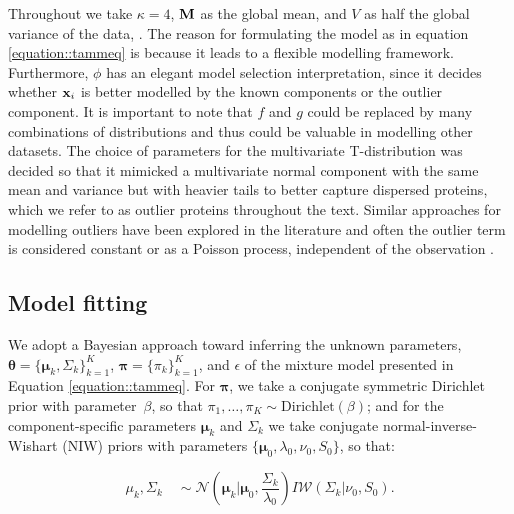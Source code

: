 \documentclass[12pt,english]{article}\usepackage[]{graphicx}\usepackage[]{color}
\begin{document}
Throughout we take $\kappa = 4$, ${\bf M}$ as the global mean, and $V$
as half the global variance of the data, {\color{black}{including labelled and unlabelled proteins}}.
The reason for formulating
the model as in equation \eqref{equation::tammeq} is because it leads
to a flexible modelling framework. Furthermore, $\phi$ has an elegant
model selection interpretation, since it decides whether ${\bf x}_i$
is better modelled by the known components or the outlier component.
It is important to note that $f$ and $g$ could be replaced by many
combinations of distributions and thus could be valuable in modelling
other datasets. The choice of parameters for the multivariate
T-distribution was decided so that it mimicked a multivariate normal
component with the same mean and variance but with heavier tails to
better capture dispersed proteins, which we refer to as outlier
proteins throughout the text. {\color{black}{The variance of the multivariate T-distribution
is designed to be large such that is relatively flat when compared with multivariate Gaussian
distributions which describe annotated components. }} Similar approaches for modelling
outliers have been explored in the literature and often the outlier
term is considered constant or as a Poisson process, independent of
the observation \citep{Banfield::1993, Cooke::2011, Coretto::2016,
  Hennig::2004}.


\subsection*{Model fitting}

We adopt a Bayesian approach toward inferring the unknown parameters,
$\boldsymbol{\theta} = \{\boldsymbol{\mu}_k, \Sigma_k \}_{k = 1}^K$,
$\boldsymbol{\pi} = \{\pi_k\}_{k = 1}^K$, and $\epsilon$ of the
mixture model presented in Equation \eqref{equation::tammeq}.  For
$\boldsymbol{\pi}$, we take a conjugate symmetric Dirichlet prior with
parameter~$\beta$, so that
$\pi_1, \ldots, \pi_K \sim \mbox{Dirichlet}(\beta)$; and for the
component-specific parameters $\boldsymbol{\mu}_k$ and $\Sigma_k$ we
take conjugate normal-inverse-Wishart (NIW) priors with parameters
$\{\boldsymbol{\mu}_0, \lambda_0, \nu_0, S_0\}$, so that:

\begin{equation} \label{equation::prior}
  \mu_k, \Sigma_k \quad \sim \mathcal{N}\left(\boldsymbol{\mu}_k|\boldsymbol{\mu}_0, \frac{\Sigma_{k}}{\lambda_0}\right)I\mathcal{W}\left(\Sigma_{k}|\nu_0, S_0\right).
\end{equation}
\end{document}
